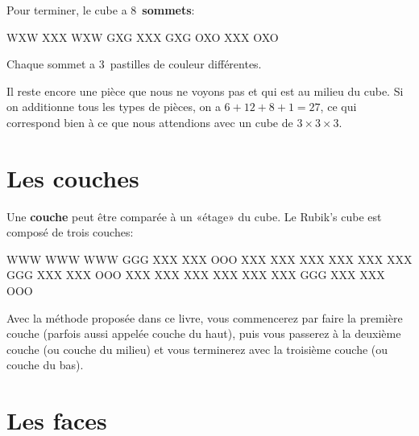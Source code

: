 Pour terminer, le cube a 8~\textbf{sommets}:

\begin{center}
	\RubikFaceUp%
	{W}{X}{W}%
	{X}{X}{X}%
	{W}{X}{W}
	\RubikFaceRight%
	{G}{X}{G}%
	{X}{X}{X}%
	{G}{X}{G}
	\RubikFaceFront%
	{O}{X}{O}%
	{X}{X}{X}%
	{O}{X}{O}
\end{center}

Chaque sommet a 3~pastilles de couleur différentes.

Il reste encore une pièce que nous ne voyons pas et qui est au milieu du cube. Si on additionne tous les types de pièces, on a $6 + 12 + 8 + 1 = 27$, ce qui correspond bien à ce que nous attendions avec un cube de $3 \times 3 \times 3$.

\section{Les couches}
\begin{samepage}
Une \textbf{couche} peut être comparée à un «étage» du cube. Le Rubik's cube est composé de trois couches:

\begin{center}
	\RubikFaceUp%
	{W}{W}{W}%
	{W}{W}{W}%
	{W}{W}{W}
	\RubikFaceRight%
	{G}{G}{G}%
	{X}{X}{X}%
	{X}{X}{X}
	\RubikFaceFront%
	{O}{O}{O}%
	{X}{X}{X}%
	{X}{X}{X}
	\hspace*{5mm}
	\RubikFaceUp%
	{X}{X}{X}%
	{X}{X}{X}%
	{X}{X}{X}
	\RubikFaceRight%
	{X}{X}{X}%
	{G}{G}{G}%
	{X}{X}{X}
	\RubikFaceFront%
	{X}{X}{X}%
	{O}{O}{O}%
	{X}{X}{X}
	\hspace*{5mm}
	\RubikFaceUp%
	{X}{X}{X}%
	{X}{X}{X}%
	{X}{X}{X}
	\RubikFaceRight%
	{X}{X}{X}%
	{X}{X}{X}%
	{G}{G}{G}
	\RubikFaceFront%
	{X}{X}{X}%
	{X}{X}{X}%
	{O}{O}{O}
\end{center}
\end{samepage}
	
Avec la méthode proposée dans ce livre, vous commencerez par faire la première couche (parfois aussi appelée couche du haut), puis vous passerez à la deuxième couche (ou couche du milieu) et vous terminerez avec la troisième couche (ou couche du bas).

\section{Les faces}


